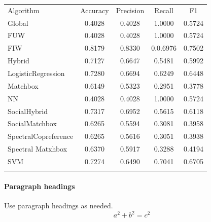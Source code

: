 \begin{table}
\begin{tabular}{ l  c  c  c  c }
\hline\noalign{\smallskip}
Algorithm & Accuracy & Precision & Recall & F1 \\
 \noalign{\smallskip}\hline\noalign{\smallskip}
Global & 0.4028 & 0.4028 & 1.0000 & 0.5724 \\
FUW & 0.4028 & 0.4028 & 1.0000 & 0.5724 \\
FIW & 0.8179 & 0.8330 & 0.0.6976 & 0.7502 \\
Hybrid & 0.7127 & 0.6647 & 0.5481 & 0.5992 \\
LogisticRegression & 0.7280 & 0.6694 & 0.6249 & 0.6448 \\
Matchbox & 0.6149 & 0.5323 & 0.2951 & 0.3778 \\
NN & 0.4028 & 0.4028 & 1.0000 & 0.5724 \\
SocialHybrid & 0.7317 & 0.6952 & 0.5615 & 0.6118 \\
SocialMatchbox & 0.6265 & 0.5594 & 0.3081 & 0.3958 \\
SpectralCopreference & 0.6265 & 0.5616 & 0.3051 & 0.3938 \\
Spectral Matxhbox & 0.6370 & 0.5917 & 0.3288 & 0.4194 \\

SVM & 0.7274 & 0.6490 & 0.7041 & 0.6705 \\
\noalign{\smallskip}\hline
\end{tabular} 
\end{table}

\paragraph{Paragraph headings} Use paragraph headings as needed.
\begin{equation}
a^2+b^2=c^2
\end{equation}

